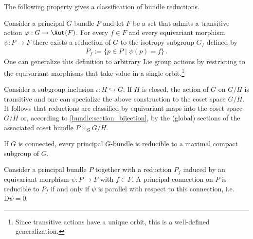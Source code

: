     The following property gives a classification of bundle reductions.
    \begin{property}\label{bundle:reduction_classification}
        Consider a principal $G$-bundle $P$ and let $F$ be a set that admits a transitive action $\varphi:G\rightarrow\Aut(F)$. For every $f\in F$ and every equivariant morphism $\psi:P\rightarrow F$ there exists a reduction of $G$ to the isotropy subgroup $G_f$ defined by
        \begin{gather}
            P_f := \{p\in P\mid\psi(p) = f\}\,.
        \end{gather}
        One can generalize this definition to arbitrary Lie group actions by restricting to the equivariant morphisms that take value in a single orbit.\footnote{Since transitive actions have a unique orbit, this is a well-defined generalization.}

        Consider a subgroup inclusion $\iota:H\hookrightarrow G$. If $H$ is closed, the action of $G$ on $G/H$ is transitive and one can specialize the above construction to the coset space $G/H$. It follows that reductions are classified by equivariant maps into the coset space $G/H$ or, according to \cref{bundle:section_bijection}, by the (global) sections of the associated coset bundle $P\times_GG/H$.
    \end{property}
    \begin{result}
        If $G$ is connected, every principal $G$-bundle is reducible to a maximal compact subgroup of $G$.
    \end{result}

    \begin{property}\label{bundle:connection_reducibility}
        Consider a principal bundle $P$ together with a reduction $P_f$ induced by an equivariant morphism $\psi:P\rightarrow F$ with $f\in F$. A principal connection on $P$ is reducible to $P_f$ if and only if $\psi$ is parallel with respect to this connection, i.e.~$\mathrm{D}\psi=0$.
    \end{property}


